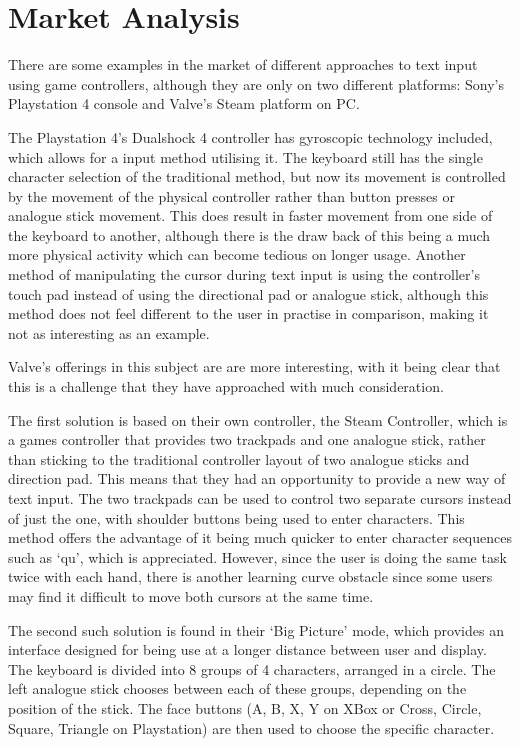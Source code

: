 \documentclass[requirements.tex]{subfiles}
\begin{document}
\section{Market Analysis} %
\label{sec:market_analysis}

There are some examples in the market of different approaches to text input
using game controllers, although they are only on two different platforms:
Sony's Playstation 4 console and Valve's Steam platform on PC.

The Playstation 4's Dualshock 4 controller has gyroscopic technology included,
which allows for a input method utilising it. The keyboard still has the single
character selection of the traditional method, but now its movement is
controlled by the movement of the physical controller rather than button presses
or analogue stick movement. This does result in faster movement from one side of
the keyboard to another, although there is the draw back of this being a much
more physical activity which can become tedious on longer usage. Another method
of manipulating the cursor during text input is using the controller's touch pad
instead of using the directional pad or analogue stick, although this method
does not feel different to the user in practise in comparison, making it not as
interesting as an example.

Valve's offerings in this subject are are more interesting, with it being clear
that this is a challenge that they have approached with much consideration.

The first solution is based on their own controller, the Steam Controller, which
is a games controller that provides two trackpads and one analogue stick, rather
than sticking to the traditional controller layout of two analogue sticks and
direction pad. This means that they had an opportunity to provide a new way of
text input. The two trackpads can be used to control two separate cursors
instead of just the one, with shoulder buttons being used to enter characters.
This method offers the advantage of it being much quicker to enter character
sequences such as `qu', which is appreciated. However, since the user is doing
the same task twice with each hand, there is another learning curve obstacle
since some users may find it difficult to move both cursors at the same time.

The second such solution is found in their `Big Picture' mode, which provides an
interface designed for being use at a longer distance between user and display.
The keyboard is divided into 8 groups of 4 characters, arranged in a circle.
The left analogue stick chooses between each of these groups, depending on the
position of the stick. The face buttons (A, B, X, Y on XBox or Cross, Circle,
Square, Triangle on Playstation) are then used to choose the specific character.
\end{document}
